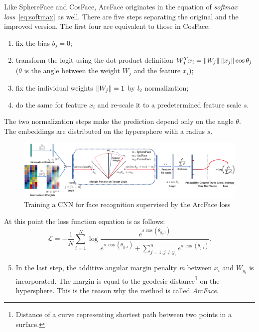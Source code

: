 Like SphereFace and CosFace, ArcFace originates in the equation of \textit{softmax loss}~\ref{eq:softmax} as well.
There are five steps separating the original and the improved version.
The first four are equivalent to those in CosFace:
\begin{enumerate}
    \item fix the bias $b_j = 0$;
    \item transform the logit using the dot product definition $W_j^T x_i = \left\lVert W_j\right\rVert \left\lVert x_j\right\rVert \cos \theta_j$
    ($\theta$ is the angle between the weight $W_j$ and the feature $x_i$);
    \item fix the individual weights $\left\lVert W_j\right\rVert = 1$ by $l_2$ normalization;
    \item do the same for feature $x_i$ and re-scale it to a predetermined feature scale $s$.
\end{enumerate}
The two normalization steps make the prediction depend only on the angle $\theta$.
The embeddings are distributed on the hypersphere with a radius $s$.

\begin{figure}[H]
    \centering
    \includegraphics[width=\columnwidth]{images/losses/arcface.png}
    \caption{Training a CNN for face recognition supervised by the ArcFace loss~\cite{ArcFace}}
    \label{fig:arcface}
\end{figure}

At this point the loss function equation is as follows:
\begin{equation}
    \mathcal{L} = -\frac{1}{N} \sum_{i=1}^{N} \log \frac{e^{s \cos(\theta_{y_i,i})}}
    {e^{s\ \cos(\theta_{y_i,i})} + \sum_{j = 1, j \neq y_i}^n e^{s\ \cos(\theta_{j,i})}}.
\end{equation}

\begin{enumerate}
    \setcounter{enumi}{4}
    \item In the last step, the additive angular margin penalty \textit{m} between $x_i$ and $W_{y_i}$ is incorporated.
    The margin is equal to the geodesic distance\footnote{Distance of a curve representing shortest path
    between two points in a surface.} on the hypersphere.
    This is the reason why the method is called \textit{ArcFace}.
\end{enumerate}

